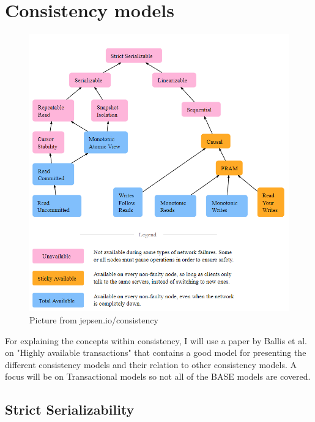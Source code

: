 \documentclass[a4paper,10pt,titlepage]{report}
\begin{document}
    \newpage

    \section{Consistency models}


    \begin{figure}
        \centering
        \includegraphics[scale=0.4]{images/consistency models.PNG}
        \caption{Picture from jepsen.io/consistency}
        \label{fig:jepsenioconsistency}
    \end{figure}

    For explaining the concepts within consistency, I will use a paper by Ballis et al. on "Highly available transactions"\cite{HighlyAvailableTransactionsVirtuesandLimitations} that contains a good model for presenting the different consistency models and their relation to other consistency models. A focus will be on Transactional models so not all of the BASE models are covered.\\

    \subsection{Strict Serializability}
\end{document}
